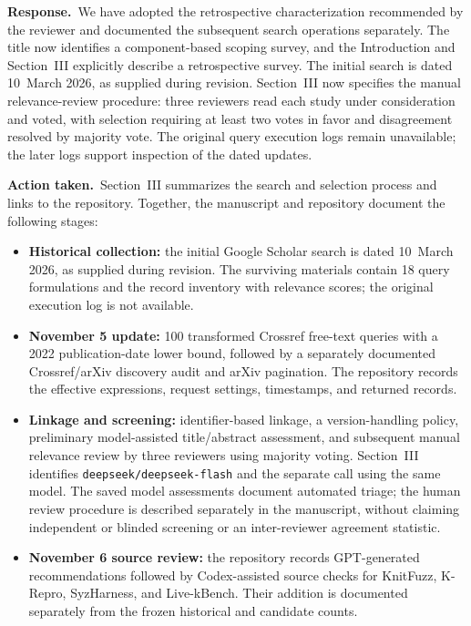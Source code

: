 \documentclass[11pt,a4paper]{article}
\newcommand{\response}{\par\textbf{Response.}\ }
\newcommand{\action}{\par\textbf{Action taken.}\ }
\begin{document}
\response We have adopted the retrospective characterization recommended by the reviewer and documented the subsequent search operations separately. The title now identifies a component-based scoping survey, and the Introduction and Section~III explicitly describe a retrospective survey. The initial search is dated 10~March 2026, as supplied during revision. Section~III now specifies the manual relevance-review procedure: three reviewers read each study under consideration and voted, with selection requiring at least two votes in favor and disagreement resolved by majority vote. The original query execution logs remain unavailable; the later logs support inspection of the dated updates.

\action Section~III summarizes the search and selection process and links to the repository. Together, the manuscript and repository document the following stages:
\begin{itemize}
\item \textbf{Historical collection:} the initial Google Scholar search is dated 10~March 2026, as supplied during revision. The surviving materials contain 18 query formulations and the record inventory with relevance scores; the original execution log is not available.
\item \textbf{November 5 update:} 100 transformed Crossref free-text queries with a 2022 publication-date lower bound, followed by a separately documented Crossref/arXiv discovery audit and arXiv pagination. The repository records the effective expressions, request settings, timestamps, and returned records.
\item \textbf{Linkage and screening:} identifier-based linkage, a version-handling policy, preliminary model-assisted title/abstract assessment, and subsequent manual relevance review by three reviewers using majority voting. Section~III identifies \texttt{deepseek/deepseek-flash} and the separate call using the same model. The saved model assessments document automated triage; the human review procedure is described separately in the manuscript, without claiming independent or blinded screening or an inter-reviewer agreement statistic.
\item \textbf{November 6 source review:} the repository records GPT-generated recommendations followed by Codex-assisted source checks for KnitFuzz, K-Repro, SyzHarness, and Live-kBench. Their addition is documented separately from the frozen historical and candidate counts.
\end{itemize}
\end{document}
